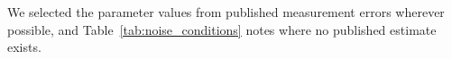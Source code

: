 We selected the parameter values from published measurement errors wherever possible, and Table~\ref{tab:noise_conditions} notes where no published estimate exists.
